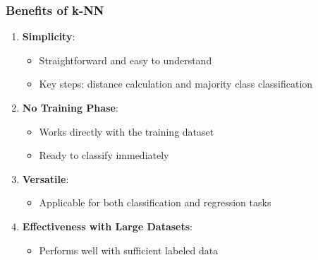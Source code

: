 \documentclass[aspectratio=169]{beamer}
\begin{document}
\begin{frame}[fragile]
  \frametitle{Benefits of k-NN}
  
  \begin{enumerate}
      \item \textbf{Simplicity}:
      \begin{itemize}
          \item Straightforward and easy to understand
          \item Key steps: distance calculation and majority class classification
      \end{itemize}
      
      \item \textbf{No Training Phase}:
      \begin{itemize}
          \item Works directly with the training dataset
          \item Ready to classify immediately
      \end{itemize}
      
      \item \textbf{Versatile}:
      \begin{itemize}
          \item Applicable for both classification and regression tasks
      \end{itemize}
      
      \item \textbf{Effectiveness with Large Datasets}:
      \begin{itemize}
          \item Performs well with sufficient labeled data
      \end{itemize}
  \end{enumerate}
\end{frame}
\end{document}
